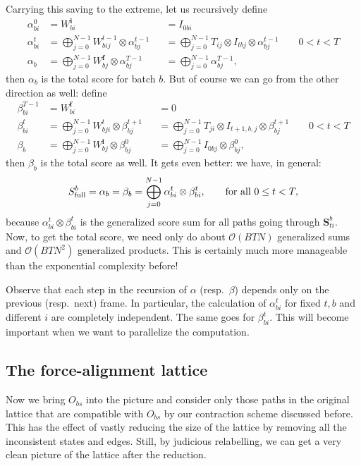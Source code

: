 \documentclass[a4paper]{article}
\begin{document}
Carrying this saving to the extreme, let us recursively define
\begin{align}
\alpha^0_{bi} &= W^{\mathbf{i}}_{bi} &&=I_{0bi} \\
\alpha^t_{bi} &= \bigoplus_{j=0}^{N-1} W^{t-1}_{bij}\otimes \alpha^{t-1}_{bj} &&= \bigoplus_{j=0}^{N-1} T_{ij} \otimes I_{tbj} \otimes \alpha^{t-1}_{bj} \qquad 0 < t < T \\
\alpha_b &= \bigoplus_{j=0}^{N-1} W^{\mathbf{f}}_{bj} \otimes \alpha^{T-1}_{bj} &&= \bigoplus_{j=0}^{N-1} \alpha^{T-1}_{bj},
\end{align}
then $\alpha_b$ is the total score for batch $b$. But of course we can go from the other direction as well: define
\begin{align}
\beta^{T-1}_{bi} &= W^{\mathbf{f}}_{bi} &&= 0 \\
\beta^{t}_{bi} &= \bigoplus_{j=0}^{N-1}W^{t}_{bji}\otimes \beta^{t+1}_{bj} &&= \bigoplus_{j=0}^{N-1} T_{ji} \otimes I_{t+1,b,j} \otimes  \beta^{t+1}_{bj} \qquad 0 < t < T\\
\beta_{b} &= \bigoplus_{j=0}^{N-1}W^{\mathbf{i}}_{bj}\otimes \beta^{0}_{bj} &&= \bigoplus_{j=0}^{N-1}I_{0bj}\otimes \beta^{0}_{bj},
\end{align}
then $\beta_b$ is the total score as well. It gets even better: we have, in general:
\begin{equation}
S^b_{\rm{full}} = \alpha_b = \beta_b = \bigoplus_{j=0}^{N-1}\alpha^t_{bi}\otimes \beta^t_{bi},\qquad \textrm{for all } 0 \leq t < T,
\end{equation}
because $\alpha^t_{bi}\otimes \beta^t_{bi}$ is the generalized score sum for all paths going through $\mathbf{S}^b_{ti}$. Now, to get the total score, we need only do about $\mathcal{O}(BTN)$ generalized sums and $\mathcal{O}(BTN^2)$ generalized products. This is certainly much more manageable than the exponential complexity before!

Observe that each step in the recursion of $\alpha$ (resp.~$\beta$) depends only on the previous (resp.~next) frame. In particular, the calculation of $\alpha^t_{bi}$ for fixed $t, b$ and different $i$ are completely independent. The same goes for $\beta^{t}_{bi}$. This will become important when we want to parallelize the computation.


\subsection{The force-alignment lattice}

Now we bring $O_{bs}$ into the picture and consider only those paths in the original lattice that are compatible with $O_{bs}$ by our contraction scheme discussed before. This has the effect of vastly reducing the size of the lattice by removing all the inconsistent states and edges. Still, by judicious relabelling, we can get a very clean picture of the lattice after the reduction.
\end{document}
